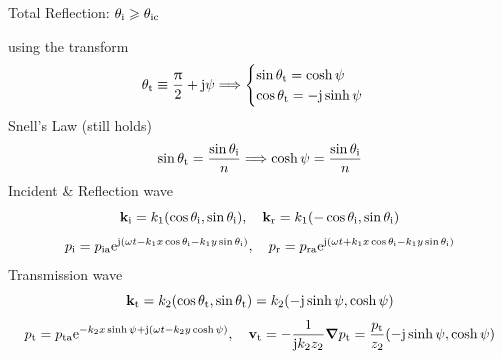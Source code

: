 \documentclass[9pt,mathserif]{beamer}
\begin{document}
\begin{frame}{Total Reflection: $\theta_\text{i} \geqslant \theta_\text{ic}$}
	\begin{outline}
		\1 using the transform
		$$\theta_\text{t} \equiv  \frac{\uppi}{2} +\mathrm{j} \psi 
		\Longrightarrow
		\begin{cases}
			\sin\theta _\text{t} = \cosh \psi\\
			\cos \theta_\text{t} = -\mathrm{j} \sinh \psi
		\end{cases}
		$$
		\1 Snell's Law (still holds)
		$$
		\sin \theta_\text{t} = \frac{\sin\theta_\text{i}}{n} \Longrightarrow
		\cosh \psi = \frac{\sin \theta _\text{i}}{n}$$
		\1 Incident \& Reflection wave
		$$\vb{k}\st{i} = k_1(\cos\theta\st{i}, \sin\theta\st{i})
		\qc \vb{k}\st{r} = k_1(-\cos\theta\st{i}, \sin\theta\st{i})
		$$
		$$
		p\st{i} = p\st{ia} \me^{\mj(\omega t-k_1x\cos\theta\st{i}-k_1y\sin\theta\st{i} )}
		\qc
		p\st{r} = p\st{ra} \me^{\mj(\omega t+k_1x\cos\theta\st{i}-k_1y\sin\theta\st{i} )}
		$$
		\1 Transmission wave
		$$\vb{k}_\text{t} = k_2 (\cos\theta_\text{t},\sin\theta_\text{t})
		=k_2(-\mathrm{j} \sinh \psi, \cosh \psi)$$
		$$ p\st{t} = p\st{ta} \me^{-k_2x\sinh \psi +\mj(\omega t-k_2y\cosh\psi )}
		\qc \vb{v}\st{t} = -\frac{1}{\mj k_2z_2} \grad p\st{t}
		= \frac{p\st{t}}{z_2}(-\mj \sinh \psi, \cosh \psi)$$
	\end{outline}
\end{frame}
\end{document}
